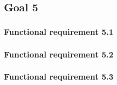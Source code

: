 \subsection{Goal 5}

\setcounter{secnumdepth}{3}
\subsubsection{Functional requirement 5.1}

\subsubsection{Functional requirement 5.2}

\subsubsection{Functional requirement 5.3}
